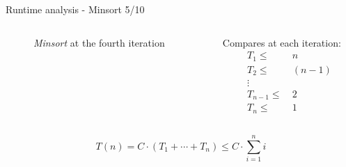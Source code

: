 
\begin{frame}{Runtime analysis - Minsort 5/10}
  \begin{columns}
    \begin{column}{0.55\textwidth}
      \begin{figure}[!h]%
        \begin{adjustbox}{width=\linewidth}%
        \end{adjustbox}%
        \caption{\textit{Minsort} at the fourth iteration}%
        \label{fig:minsort_brace}%
      \end{figure}
    \end{column}
    \begin{column}{0.40\textwidth}
      Compares at each iteration:
      \begin{align*}
        T_1  \leq &~ n\\
        T_2  \leq &~ (n-1)\\
        {}  \vdots~ &~ {} \\
        T_{n-1}  \leq &~ 2\\
        T_n  \leq &~ 1
      \end{align*}
    \end{column}
  \end{columns}
  \[
    T(n)
      = C \cdot \left(T_1 + \cdots + T_n\right)
      \leq C \cdot \sum \limits^n_{i=1} i
  \]
\end{frame}




